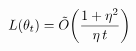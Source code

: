 \documentclass[preview]{standalone}
\begin{document}
\begin{align*}
\special{dvisvgm:raw <g id='unique000'>}L(\theta_t) = \tilde{O}\!\left(\frac{1+\eta^2}{\eta\,t}\right)\special{dvisvgm:raw </g>}
\end{align*}
\end{document}
